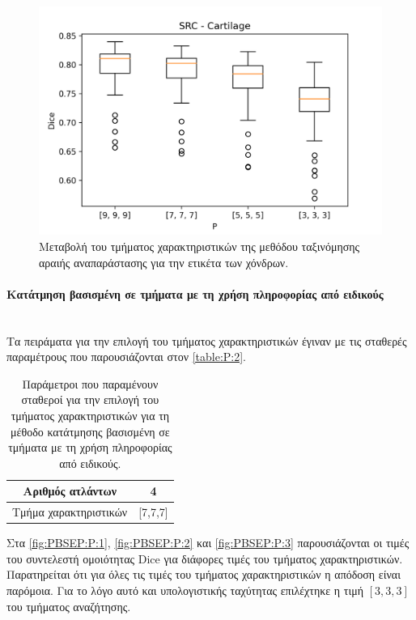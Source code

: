 \documentclass[a4paper,12pt]{article}
\newcommand{\paragraphLine}[1]{\paragraph{#1}\mbox{}\\}
\begin{document}
\begin{figure}[H]
    \centering
    \includegraphics[width=0.85\linewidth]{SRC_P_Cartilage_plot.png}
    \caption{Μεταβολή του τμήματος χαρακτηριστικών της μεθόδου ταξινόμησης
             αραιής αναπαράστασης για την ετικέτα των χόνδρων.}
    \label{fig:SRC:P:3}
\end{figure}

\paragraphLine{Κατάτμηση βασισμένη σε τμήματα με τη χρήση πληροφορίας από
               ειδικούς}

Τα πειράματα για την επιλογή του τμήματος χαρακτηριστικών έγιναν με τις σταθερές
παραμέτρους που παρουσιάζονται στον \autoref{table:P:2}.

\begin{table}[h!]
    \centering
    \begin{tabular}{|c|c|} 
        \hline
        Αριθμός ατλάντων & 4 \\ 
        \hline
        Τμήμα χαρακτηριστικών & [7,7,7] \\ 
        \hline
    \end{tabular}
    \caption{Παράμετροι που παραμένουν σταθεροί για την επιλογή του τμήματος
             χαρακτηριστικών για τη μέθοδο κατάτμησης βασισμένη σε τμήματα με τη
             χρήση πληροφορίας από ειδικούς.}
    \label{table:P:2}
\end{table}

Στα \autoref{fig:PBSEP:P:1}, \autoref{fig:PBSEP:P:2} και \autoref{fig:PBSEP:P:3}
παρουσιάζονται οι τιμές του συντελεστή ομοιότητας Dice για διάφορες τιμές του
τμήματος χαρακτηριστικών. Παρατηρείται ότι για όλες τις τιμές του τμήματος
χαρακτηριστικών η απόδοση είναι παρόμοια. Για το λόγο αυτό και υπολογιστικής
ταχύτητας επιλέχτηκε η τιμή $[3,3,3]$ του τμήματος αναζήτησης.
\end{document}
